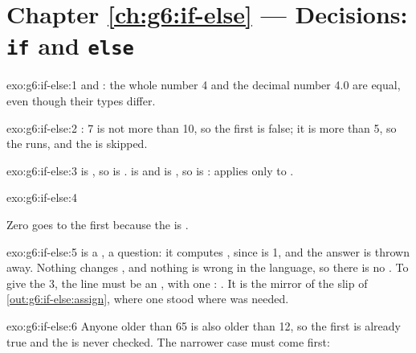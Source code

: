 \section*{Chapter \ref{ch:g6:if-else} --- Decisions: \texttt{if} and \texttt{else}}

\begin{solution}{exo:g6:if-else:1}
 and : the whole number 4 and the decimal number 4.0 are
equal, even though their types differ.
\end{solution}

\begin{solution}{exo:g6:if-else:2}
: 7 is not more than 10, so the first  is false; it is
more than 5, so the   runs, and the  is skipped.
\end{solution}

\begin{solution}{exo:g6:if-else:3}
 is , so  is .
 is  and  is , so 
is :  applies only to .
\end{solution}

\begin{solution}{exo:g6:if-else:4}
\label{lst:g6:if-else:sol-sign}

Zero goes to the first  because the  is \code{>=}.
\end{solution}

\begin{solution}{exo:g6:if-else:5}
 is a , a question: it computes , since 
is 1, and the answer is thrown away. Nothing changes , and nothing is
wrong in the language, so there is no . To give  the  3,
the line must be an , with one \code{=}: . It is the mirror of
the slip of \cref{out:g6:if-else:assign}, where one \code{=} stood where
\code{==} was needed.
\end{solution}

\begin{solution}{exo:g6:if-else:6}
Anyone older than 65 is also older than 12, so the first  is already
true and the  is never checked. The narrower case must come first:

\label{lst:g6:if-else:sol-senior}
\end{solution}

